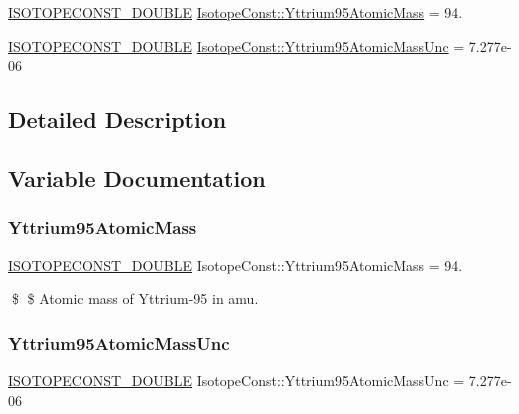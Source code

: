 \begin{DoxyCompactItemize}
\item 
\mbox{\hyperlink{group___isotope_const-_macros_ga8f45a7272ce02c0b4c65c44636ed719a}{I\+S\+O\+T\+O\+P\+E\+C\+O\+N\+S\+T\+\_\+\+D\+O\+U\+B\+LE}} \mbox{\hyperlink{group___isotope_const-_yttrium-_y95_gafa9b2226ff91bfcbb2c3f737cc27166b}{Isotope\+Const\+::\+Yttrium95\+Atomic\+Mass}} = 94.
\item 
\mbox{\hyperlink{group___isotope_const-_macros_ga8f45a7272ce02c0b4c65c44636ed719a}{I\+S\+O\+T\+O\+P\+E\+C\+O\+N\+S\+T\+\_\+\+D\+O\+U\+B\+LE}} \mbox{\hyperlink{group___isotope_const-_yttrium-_y95_ga4f0ed705680eb66f69fdfc2f45ef9c37}{Isotope\+Const\+::\+Yttrium95\+Atomic\+Mass\+Unc}} = 7.\+277e-\/06
\end{DoxyCompactItemize}


\subsection{Detailed Description}


\subsection{Variable Documentation}
\mbox{\label{group___isotope_const-_yttrium-_y95_gafa9b2226ff91bfcbb2c3f737cc27166b}} 
\subsubsection{\texorpdfstring{Yttrium95\+Atomic\+Mass}{Yttrium95AtomicMass}}
{\footnotesize\ttfamily \mbox{\hyperlink{group___isotope_const-_macros_ga8f45a7272ce02c0b4c65c44636ed719a}{I\+S\+O\+T\+O\+P\+E\+C\+O\+N\+S\+T\+\_\+\+D\+O\+U\+B\+LE}} Isotope\+Const\+::\+Yttrium95\+Atomic\+Mass = 94.}

\$ \$ Atomic mass of Yttrium-\/95 in amu. \mbox{\label{group___isotope_const-_yttrium-_y95_ga4f0ed705680eb66f69fdfc2f45ef9c37}} 
\subsubsection{\texorpdfstring{Yttrium95\+Atomic\+Mass\+Unc}{Yttrium95AtomicMassUnc}}
{\footnotesize\ttfamily \mbox{\hyperlink{group___isotope_const-_macros_ga8f45a7272ce02c0b4c65c44636ed719a}{I\+S\+O\+T\+O\+P\+E\+C\+O\+N\+S\+T\+\_\+\+D\+O\+U\+B\+LE}} Isotope\+Const\+::\+Yttrium95\+Atomic\+Mass\+Unc = 7.\+277e-\/06}


